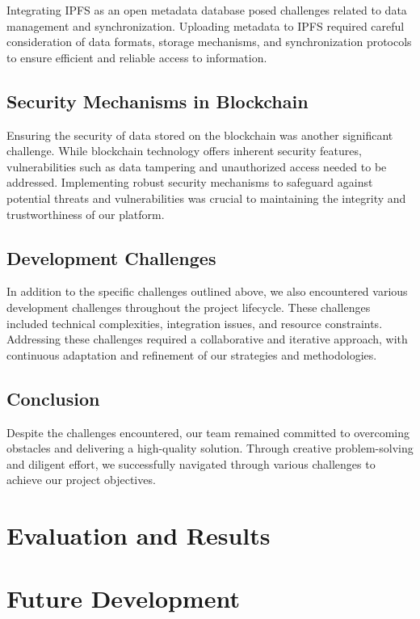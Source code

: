 \documentclass{article}
\begin{document}
Integrating IPFS as an open metadata database posed challenges related to data management and synchronization. Uploading metadata to IPFS required careful consideration of data formats, storage mechanisms, and synchronization protocols to ensure efficient and reliable access to information.

\subsection{Security Mechanisms in Blockchain}

Ensuring the security of data stored on the blockchain was another significant challenge. While blockchain technology offers inherent security features, vulnerabilities such as data tampering and unauthorized access needed to be addressed. Implementing robust security mechanisms to safeguard against potential threats and vulnerabilities was crucial to maintaining the integrity and trustworthiness of our platform.

\subsection{Development Challenges}

In addition to the specific challenges outlined above, we also encountered various development challenges throughout the project lifecycle. These challenges included technical complexities, integration issues, and resource constraints. Addressing these challenges required a collaborative and iterative approach, with continuous adaptation and refinement of our strategies and methodologies.

\subsection{Conclusion}

Despite the challenges encountered, our team remained committed to overcoming obstacles and delivering a high-quality solution. Through creative problem-solving and diligent effort, we successfully navigated through various challenges to achieve our project objectives.


\section{Evaluation and Results}

\section{Future Development}
\end{document}
